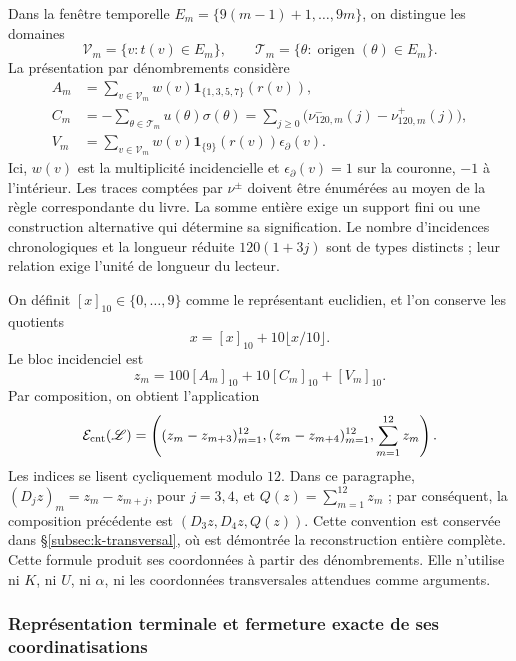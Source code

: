 Dans la fenêtre temporelle
\(E_m=\{9(m-1)+1,\ldots,9m\}\), on distingue les domaines
\[
 \mathscr V_m=\{v:t(v)\in E_m\},\qquad
 \mathscr T_m=\{\theta:\operatorname{origen}(\theta)\in E_m\}.
\]
La présentation par dénombrements considère
\begin{align}
 A_m&=\sum_{v\in\mathscr V_m}w(v)
             \mathbf1_{\{1,3,5,7\}}(r(v)),\\
 C_m&=-\sum_{\theta\in\mathscr T_m}u(\theta)\sigma(\theta)
      =\sum_{j\geq0}\bigl(\nu^-_{120,m}(j)-\nu^+_{120,m}(j)\bigr),\\
 V_m&=\sum_{v\in\mathscr V_m}w(v)
              \mathbf1_{\{9\}}(r(v))\epsilon_\partial(v).
\end{align}
Ici, \(w(v)\) est la multiplicité incidencielle et
\(\epsilon_\partial(v)=1\) sur la couronne, \(-1\) à l'intérieur.
Les traces comptées par \(\nu^\pm\) doivent être énumérées au moyen de la règle
correspondante du livre. La somme entière exige un support fini ou une
construction alternative qui détermine sa signification. Le nombre
d'incidences chronologiques et la longueur réduite \(120(1+3j)\) sont de
types distincts ; leur relation exige l'unité de longueur du lecteur.

On définit \([x]_{10}\in\{0,\ldots,9\}\) comme le représentant
euclidien, et l'on conserve les quotients
\[
 x=[x]_{10}+10\lfloor x/10\rfloor.
\]
Le bloc incidenciel est
\begin{equation}
 z_m=100[A_m]_{10}+10[C_m]_{10}+[V_m]_{10}.
 \label{eq:registro-bloque-incidencial}
\end{equation}
Par composition, on obtient l'application
\begin{equation}
 \mathcal E_{\rm cnt}(\mathscr L)=
 \left((z_m-z_{m+3})_{m=1}^{12},
       (z_m-z_{m+4})_{m=1}^{12},\sum_{m=1}^{12}z_m\right).
\label{eq:registro-composicion-incidencial}
\end{equation}
Les indices se lisent cycliquement modulo \(12\). Dans ce paragraphe,
\((D_jz)_m=z_m-z_{m+j}\), pour \(j=3,4\), et
\(Q(z)=\sum_{m=1}^{12}z_m\) ; par conséquent, la composition précédente est
\((D_3z,D_4z,Q(z))\). Cette convention est conservée dans
\S\ref{subsec:k-transversal}, où est démontrée la reconstruction
entière complète.
Cette formule produit ses coordonnées à partir des dénombrements. Elle n’utilise
ni \(K\), ni \(U\), ni \(\alpha\), ni les coordonnées transversales attendues
comme arguments.

\subsubsection{Représentation terminale et fermeture exacte de ses coordinatisations}

